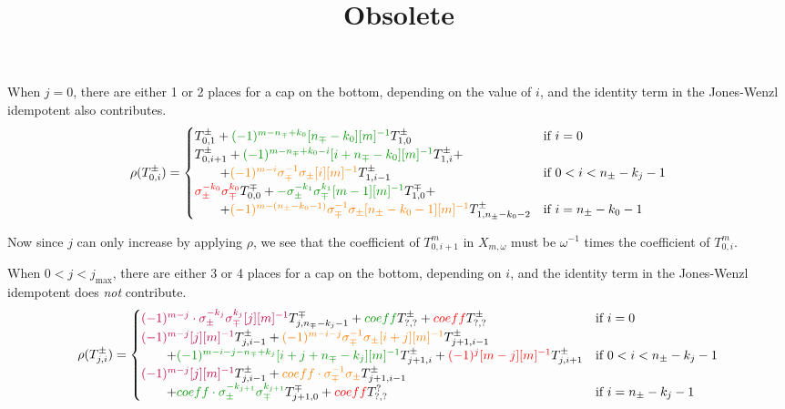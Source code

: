 \documentclass{article}
\title{Obsolete}
\begin{document}
\maketitle



When $j=0$, there are either 1 or 2 places for a cap on the bottom, depending on the value of $i$, and the identity term in the Jones-Wenzl idempotent also contributes.
$$
\rho(T^\pm_{0,i}) = 
\begin{cases}
T^\pm_{0,1}
+\textcolor{DarkGreen}{(-1)^{m-n_\mp+k_0}[n_\mp-k_0][m]^{-1}} T^\pm_{1,0}&\text{if $i=0$}
\\
T^\pm_{0,i+1}
+\textcolor{DarkGreen}{(-1)^{m-n_\mp+k_0-i}[i+n_\mp-k_0][m]^{-1}} T^\pm_{1,i} +
\\ \qquad + \textcolor{orange}{(-1)^{m-i} \sigma^{-1}_\mp\sigma_\pm [i][m]^{-1}} T^\pm_{1,i-1}
&\text{if }0 < i <n_\pm-k_j-1
\\
\textcolor{red}{\sigma_\pm^{-k_0} \sigma_\mp^{k_0}} T^\mp_{0,0}
+\textcolor{DarkGreen}{-\sigma_\pm^{-k_1} \sigma_\mp^{k_1} [m-1][m]^{-1} } T^\mp_{1,0} +
\\ \qquad +\textcolor{orange}{(-1)^{m-(n_\pm-k_0-1)} \sigma^{-1}_\mp\sigma_\pm [n_\pm-k_0-1][m]^{-1} } T^\pm_{1,n_\pm-k_0-2}
&\text{if } i = n_\pm-k_0-1
\end{cases}
$$

Now since $j$ can only increase by applying $\rho$, we see that the coefficient of $T^m_{0,i+1}$ in $X_{m,\omega}$ must be $\omega^{-1}$ times the coefficient of $T^m_{0,i}$.

When $0<j<j_{\text{max}}$, there are 
either 3 or 4 places for a cap on the bottom, depending on $i$, and the identity term in the Jones-Wenzl idempotent does \emph{not} contribute.
$$
\rho(T^\pm_{j,i}) = 
\begin{cases}
\textcolor{purple}{(-1)^{m-j}\cdot \sigma_\pm^{-k_j}\sigma_\mp^{k_j} [j][m]^{-1}} T^\mp_{j,n_\mp-k_j-1}
+\textcolor{DarkGreen}{coeff} T^\pm_{?,?}
+\textcolor{red}{coeff} T^\pm_{?,?}
&\text{if $i=0$}
\\
\textcolor{purple}{(-1)^{m-j}[j][m]^{-1}} T^\pm_{j,i-1}
+\textcolor{orange}{(-1)^{m-i-j} \sigma^{-1}_\mp\sigma_\pm [i+j][m]^{-1} } T^\pm_{j+1,i-1}
\\ \qquad
+\textcolor{DarkGreen}{(-1)^{m-i-j-n_{\mp}+k_j}[i+j+n_{\mp}-k_j][m]^{-1}} T^\pm_{j+1,i}
+\textcolor{red}{(-1)^j [m-j][m]^{-1}} T^\pm_{j,i+1}
&\text{if $0 < i <n_\pm-k_j-1$}
\\
\textcolor{purple}{(-1)^{m-j}[j][m]^{-1}} T^\pm_{j,i-1}
+\textcolor{orange}{coeff \cdot \sigma^{-1}_\mp\sigma_\pm} T^\pm_{j+1,i-1}
\\ \qquad
+\textcolor{DarkGreen}{coeff \cdot\sigma_\pm^{-k_{j+1}}\sigma_\mp^{k_{j+1}} } T^{\mp}_{j+1,0}
+\textcolor{red}{coeff} T^{?}_{?,?}
&\text{if  $i =n_\pm-k_j-1$}
\end{cases}
$$
\end{document}
